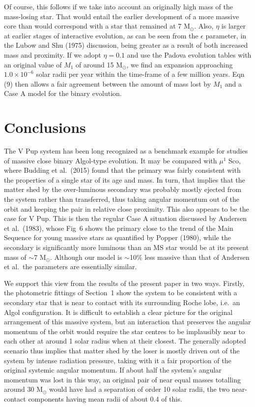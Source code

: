 \documentclass[useAMS,usenatbib]{mnras}                                                                           \usepackage[pdftex]{graphicx}
\begin{document}
{Of course, this follows  if we take into account an originally 
high mass of the mass-losing star.  That would
entail the earlier development of a more massive core than would
correspond with a star that remained at 7 M$_{\odot}$.
Also, $\eta$ is larger at earlier stages of interactive evolution,
as can be seen from the $\epsilon$ parameter, in the Lubow and Shu (1975) discussion,
being greater as a result of both increased mass and proximity.
If we adopt $\eta = 0.1$ and use the Padova evolution tables with 
an original value of $M_1$ of around 15 M$_{\odot}$, we find 
an expansion approaching $ 1.0\times 10^{-6}$ solar radii per year 
within the time-frame of a few million years.
 Eqn (9) then allows a
fair agreement between the amount of mass lost by $M_1$ and a Case A model
for the binary evolution.

\section{Conclusions}
 
  The V Pup system has been long recognized as a benchmark example 
  for studies of massive close binary Algol-type evolution.  It may be compared with 
  $\mu^1$ Sco, where Budding et al.\ (2015) found that the primary was 
  fairly consistent with the properties of a single star of its age and mass.  In turn, 
  that implies that the matter shed by the over-luminous secondary was probably mostly
  ejected from the system rather than transferred, thus taking angular momentum
  out of the orbit and keeping the pair in relative close proximity.  This also appears 
  to be the case for V Pup.
  This is then the regular Case A situation 
  discussed by Andersen et al.\ (1983), whose Fig~6
  shows the primary close to the trend of the Main Sequence for young massive stars
  as quantified by Popper (1980), while the secondary is significantly
  more luminous than an MS star would be at its present mass  of $\sim$7 M$_{\odot}$.  
  Although  our model is $\sim$10\% less massive than that of Andersen et al.\ the   
  parameters are essentially similar.
  
  We support this view from  the results of the present paper in two ways.
  Firstly, the photometric fittings of Section~1 show the system to be 
  consistent with a secondary star that is near to contact with its surrounding Roche lobe,
  i.e.\ an Algol configuration.  It is difficult to establish a clear 
  picture for the original arrangement of this massive system, but an interaction
  that preserves the angular momentum of the orbit would require the
  star centres to be implausibly near to each other at around 1 solar radius
  when at their closest.  The generally adopted scenario thus implies that matter shed
  by the loser is mostly driven out of the system by intense radiation pressure,
  taking with it a fair proportion of the original systemic angular momentum.
  If about half the system's angular momentum was lost in this way,
  an original pair of near equal masses totalling around 30 M$_{\odot}$
  would have had a separation of order 10 solar radii,
  the two near-contact components having mean radii of about 0.4 of this.   

}
\end{document}
